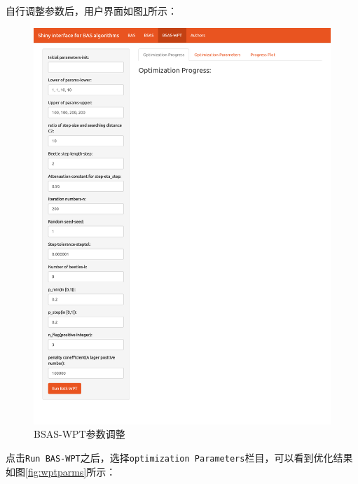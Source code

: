 \documentclass[]{ctexbook}
\newenvironment{Shaded}{\begin{snugshade}}{\end{snugshade}}
\newcommand{\KeywordTok}[1]{\textcolor[rgb]{0.13,0.29,0.53}{\textbf{#1}}}
\newcommand{\DataTypeTok}[1]{\textcolor[rgb]{0.13,0.29,0.53}{#1}}
\newcommand{\OperatorTok}[1]{\textcolor[rgb]{0.81,0.36,0.00}{\textbf{#1}}}
\newcommand{\NormalTok}[1]{#1}
\theoremstyle{definition}
\theoremstyle{definition}
\theoremstyle{definition}
\theoremstyle{remark}
\begin{document}
\begin{Shaded}
\end{Shaded}

自行调整参数后，用户界面如图\ref{fig:wpt1}所示：

\begin{figure}

{\centering \includegraphics[width=0.95\linewidth]{img/wpt1} 

}

\caption{BSAS-WPT参数调整}\label{fig:wpt1}
\end{figure}

点击\texttt{Run\ BAS-WPT}之后，选择\texttt{optimization\ Parameters}栏目，可以看到优化结果如图\ref{fig:wptparms}所示：
\end{document}
